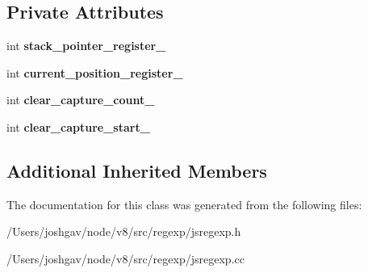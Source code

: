 \subsection*{Private Attributes}
\begin{DoxyCompactItemize}
\item 
int {\bfseries stack\+\_\+pointer\+\_\+register\+\_\+}\hypertarget{classv8_1_1internal_1_1_negative_submatch_success_a7f24bd4215bc18800ee8e15b979d093c}{}\label{classv8_1_1internal_1_1_negative_submatch_success_a7f24bd4215bc18800ee8e15b979d093c}

\item 
int {\bfseries current\+\_\+position\+\_\+register\+\_\+}\hypertarget{classv8_1_1internal_1_1_negative_submatch_success_adb4a22e2d53adf9f3ab4bb76843ead1d}{}\label{classv8_1_1internal_1_1_negative_submatch_success_adb4a22e2d53adf9f3ab4bb76843ead1d}

\item 
int {\bfseries clear\+\_\+capture\+\_\+count\+\_\+}\hypertarget{classv8_1_1internal_1_1_negative_submatch_success_a8b8350bad3fed0fd21816433c8b6fae1}{}\label{classv8_1_1internal_1_1_negative_submatch_success_a8b8350bad3fed0fd21816433c8b6fae1}

\item 
int {\bfseries clear\+\_\+capture\+\_\+start\+\_\+}\hypertarget{classv8_1_1internal_1_1_negative_submatch_success_a770ed4dbe48dacc2ef3db5fc76c2e133}{}\label{classv8_1_1internal_1_1_negative_submatch_success_a770ed4dbe48dacc2ef3db5fc76c2e133}

\end{DoxyCompactItemize}
\subsection*{Additional Inherited Members}


The documentation for this class was generated from the following files\+:\begin{DoxyCompactItemize}
\item 
/\+Users/joshgav/node/v8/src/regexp/jsregexp.\+h\item 
/\+Users/joshgav/node/v8/src/regexp/jsregexp.\+cc\end{DoxyCompactItemize}
